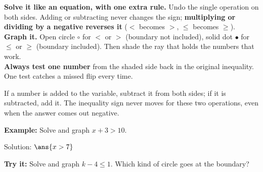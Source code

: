 \documentclass[12pt]{article}
\begin{document}

\begin{formulabox}
\textbf{Solve it like an equation, with one extra rule.} Undo the single
operation on both sides. Adding or subtracting never changes the sign;
\textbf{multiplying or dividing by a negative reverses it} ($<$ becomes $>$,
$\le$ becomes $\ge$).\\[3pt]
\textbf{Graph it.} Open circle $\circ$ for $<$ or $>$ (boundary not included),
solid dot $\bullet$ for $\le$ or $\ge$ (boundary included). Then shade the ray
that holds the numbers that work.\\[3pt]
\textbf{Always test one number} from the shaded side back in the original
inequality. One test catches a missed flip every time.
\end{formulabox}


\begin{formulabox}
If a number is added to the variable, subtract it from both sides; if it is
subtracted, add it. The inequality sign never moves for these two operations,
even when the answer comes out negative.
\end{formulabox}

\begin{examplebox}
\textbf{Example:} Solve and graph $x + 3 > 10$.
\begin{center}
\end{center}
Solution: $\ans{x > 7}$
\end{examplebox}

\begin{tryitbox}
\textbf{Try it:} Solve and graph $k - 4 \le 1$. Which kind of circle goes at
the boundary?\\[2pt]
\end{tryitbox}
\end{document}

